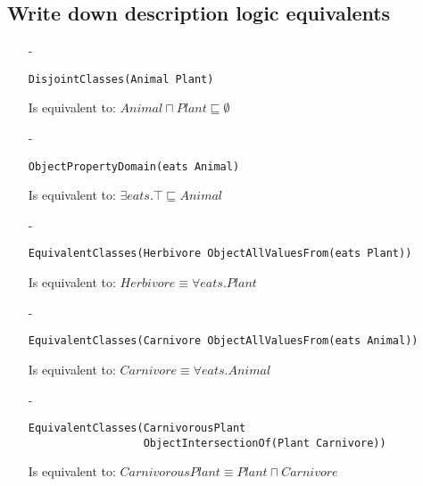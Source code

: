 \documentclass[a4paper,12pt]{article}
\begin{document}
\subsection[DL equivalents]{Write down description logic equivalents}
\begin{itemize}
\item[-]\begin{Verbatim}[samepage=true]
DisjointClasses(Animal Plant)
\end{Verbatim}
Is equivalent to: $ Animal \sqcap Plant \sqsubseteq \emptyset $

\item[-]\begin{Verbatim}[samepage=true]
ObjectPropertyDomain(eats Animal)
\end{Verbatim}
Is equivalent to: $ \exists eats.\top \sqsubseteq Animal $

\item[-]\begin{Verbatim}[samepage=true]
EquivalentClasses(Herbivore ObjectAllValuesFrom(eats Plant))
\end{Verbatim}
Is equivalent to: $ Herbivore \equiv \forall eats.Plant $

\item[-]\begin{Verbatim}[samepage=true]
EquivalentClasses(Carnivore ObjectAllValuesFrom(eats Animal))
\end{Verbatim}
Is equivalent to: $ Carnivore \equiv \forall eats.Animal $

\item[-]\begin{Verbatim}[samepage=true]
EquivalentClasses(CarnivorousPlant 
                  ObjectIntersectionOf(Plant Carnivore))
\end{Verbatim}
Is equivalent to: $ CarnivorousPlant \equiv Plant \sqcap Carnivore $
\end{itemize}
\end{document}
